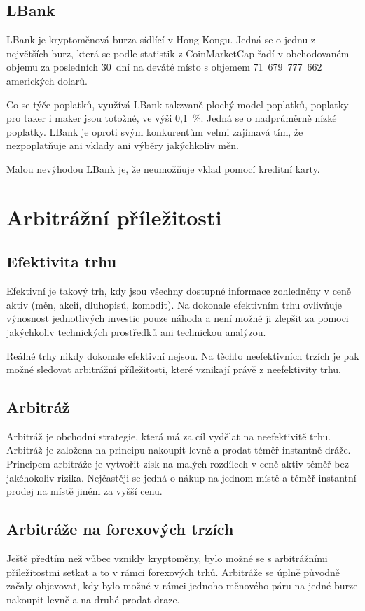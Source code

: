 \documentclass[thesis=B,czech]{FITthesis}[2019/03/21]
\begin{document}
\subsection{LBank}
LBank je kryptoměnová burza sídlící v Hong Kongu. Jedná se o jednu z největších burz, která se podle statistik z CoinMarketCap řadí v obchodovaném objemu za posledních 30~dní na deváté místo s objemem 71~679~777~662 amerických dolarů. \cite{coinmarketcap} \cite{cryptowisser_lbank}

Co se týče poplatků, využívá LBank takzvaně plochý model poplatků, poplatky pro taker i maker jsou totožné, ve výši 0,1~\%. Jedná se o nadprůměrně nízké poplatky. LBank je oproti svým konkurentům velmi zajímavá tím, že nezpoplatňuje ani vklady ani výběry jakýchkoliv měn. 

Malou nevýhodou LBank je, že neumožňuje vklad pomocí kreditní karty. \cite{cryptowisser_lbank}


\section{Arbitrážní příležitosti}
\subsection{Efektivita trhu}
Efektivní je takový trh, kdy jsou všechny dostupné informace zohledněny v ceně aktiv (měn, akcií, dluhopisů, komodit). Na dokonale efektivním trhu ovlivňuje výnosnost jednotlivých investic pouze náhoda a není možné ji zlepšit za pomoci jakýchkoliv technických prostředků ani technickou analýzou. \cite{efektivita_trhu}

Reálné trhy nikdy dokonale efektivní nejsou. Na těchto neefektivních trzích je pak možné sledovat arbitrážní příležitosti, které vznikají právě z neefektivity trhu. \cite{what_is_arbitage}

\subsection{Arbitráž}
Arbitráž je obchodní strategie, která má za cíl vydělat na neefektivitě trhu. Arbitráž je založena na principu nakoupit levně a prodat téměř instantně dráže. Principem arbitráže je vytvořit zisk na malých rozdílech v ceně aktiv téměř bez jakéhokoliv rizika. Nejčastěji se jedná o nákup na jednom místě a téměř instantní prodej na místě jiném za vyšší cenu. \cite{Capital}

\subsection{Arbitráže na forexových trzích}
Ještě předtím než vůbec vznikly kryptoměny, bylo možné se s arbitrážními příležitostmi setkat a to v rámci forexových trhů. Arbitráže se úplně původně začaly objevovat, kdy bylo možné v rámci jednoho měnového páru na jedné burze nakoupit levně a na druhé prodat draze. 
\end{document}
